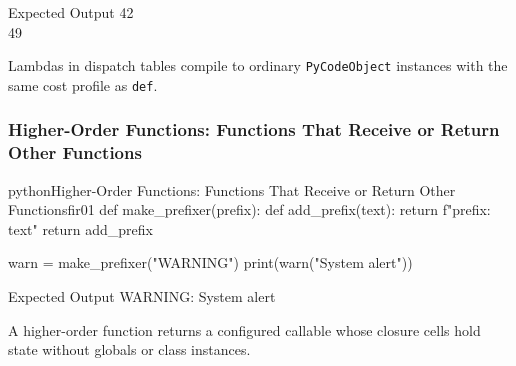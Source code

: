 \begin{iobox}{Expected Output}
42 \\
49 \\
\end{iobox}




Lambdas in dispatch tables compile to ordinary \texttt{PyCodeObject} instances with the same cost profile as \texttt{def}.

\subsubsection{Higher-Order Functions: Functions That Receive or Return Other Functions}

\begin{codebox}[]{python}{Higher-Order Functions: Functions That Receive or Return Other Functions}{fir01}
def make_prefixer(prefix):
    def add_prefix(text):
        return f"{prefix}: {text}"
    return add_prefix

warn = make_prefixer("WARNING")
print(warn("System alert"))
\end{codebox}


\begin{iobox}{Expected Output}
WARNING: System alert \\
\end{iobox}




A higher-order function returns a configured callable whose closure cells hold state without globals or class instances.

